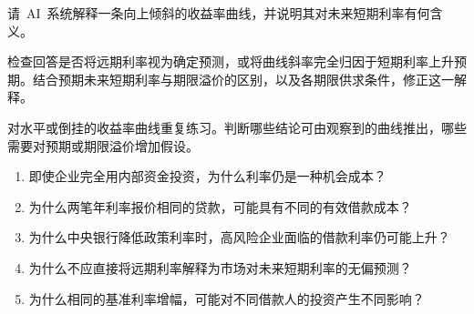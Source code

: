 请~AI~系统解释一条向上倾斜的收益率曲线，并说明其对未来短期利率有何含义。

检查回答是否将远期利率视为确定预测，或将曲线斜率完全归因于短期利率上升预期。结合预期未来短期利率与期限溢价的区别，以及各期限供求条件，修正这一解释。

对水平或倒挂的收益率曲线重复练习。判断哪些结论可由观察到的曲线推出，哪些需要对预期或期限溢价增加假设。



\begin{enumerate}

\item 即使企业完全用内部资金投资，为什么利率仍是一种机会成本？

\item 为什么两笔年利率报价相同的贷款，可能具有不同的有效借款成本？

\item 为什么中央银行降低政策利率时，高风险企业面临的借款利率仍可能上升？

\item 为什么不应直接将远期利率解释为市场对未来短期利率的无偏预测？

\item 为什么相同的基准利率增幅，可能对不同借款人的投资产生不同影响？

\end{enumerate}



